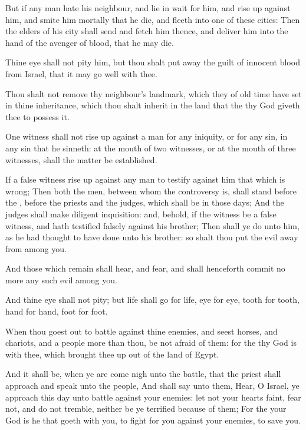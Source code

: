 \Verse But if any man hate his neighbour, and lie in wait for him, and rise up against him, and smite him mortally that he die, and fleeth into one of these cities: \Verse Then the elders of his city shall send and fetch him thence, and deliver him into the hand of the avenger of blood, that he may die.

\Verse Thine eye shall not pity him, but thou shalt put away the guilt of innocent blood from Israel, that it may go well with thee.

\Verse Thou shalt not remove thy neighbour's landmark, which they of old time have set in thine inheritance, which thou shalt inherit in the land that the \LORD thy God giveth thee to possess it.

\Verse One witness shall not rise up against a man for any iniquity, or for any sin, in any sin that he sinneth: at the mouth of two witnesses, or at the mouth of three witnesses, shall the matter be established.

\Verse If a false witness rise up against any man to testify against him that which is wrong; \Verse Then both the men, between whom the controversy is, shall stand before the \LORD, before the priests and the judges, which shall be in those days; \Verse And the judges shall make diligent inquisition: and, behold, if the witness be a false witness, and hath testified falsely against his brother; \Verse Then shall ye do unto him, as he had thought to have done unto his brother: so shalt thou put the evil away from among you.

\Verse And those which remain shall hear, and fear, and shall henceforth commit no more any such evil among you.

\Verse And thine eye shall not pity; but life shall go for life, eye for eye, tooth for tooth, hand for hand, foot for foot.


\Chapter
\Verse When thou goest out to battle against thine enemies, and seest horses, and chariots, and a people more than thou, be not afraid of them: for the \LORD thy God is with thee, which brought thee up out of the land of Egypt.

\Verse And it shall be, when ye are come nigh unto the battle, that the priest shall approach and speak unto the people, \Verse And shall say unto them, Hear, O Israel, ye approach this day unto battle against your enemies: let not your hearts faint, fear not, and do not tremble, neither be ye terrified because of them; \Verse For the \LORD your God is he that goeth with you, to fight for you against your enemies, to save you.

